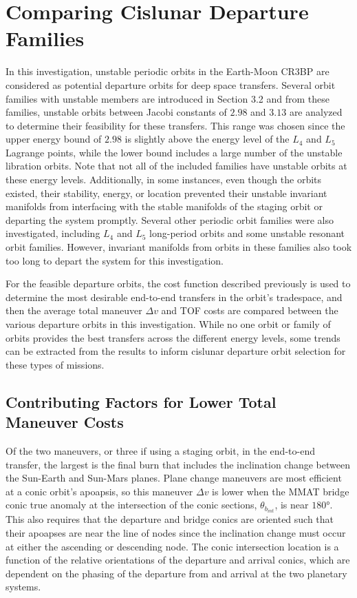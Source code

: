 \section{Comparing Cislunar Departure Families}
In this investigation, unstable periodic orbits in the Earth-Moon CR3BP are considered as potential
departure orbits for deep space transfers. Several orbit families with unstable members are
introduced in Section 3.2 and from these families, unstable orbits between Jacobi constants of
$2.98$ and $3.13$ are analyzed to determine their feasibility for these transfers. This range was
chosen since the upper energy bound of $2.98$ is slightly above the energy level of the $L_{4}$ and
$L_{5}$ Lagrange points, while the lower bound includes a large number of the unstable libration
orbits\cite{Zimovan:2017}. Note that not all of the included families have unstable orbits at these
energy levels. Additionally, in some instances, even though the orbits existed, their stability,
energy, or location prevented their unstable invariant manifolds from interfacing with the stable
manifolds of the staging orbit or departing the system promptly. Several other periodic orbit
families were also investigated, including $L_{4}$ and $L_{5}$ long-period orbits and some unstable
resonant orbit families. However, invariant manifolds from orbits in these families also took too
long to depart the system for this investigation.

For the feasible departure orbits, the cost function described previously is used to determine the
most desirable end-to-end transfers in the orbit's tradespace, and then the average total
maneuver $\Delta v$ and TOF costs are compared between the various departure orbits in this
investigation. While no one orbit or family of orbits provides the best transfers across the
different energy levels, some trends can be extracted from the results to inform cislunar departure
orbit selection for these types of missions.

\subsection{Contributing Factors for Lower Total Maneuver Costs}
Of the two maneuvers, or three if using a staging orbit, in the end-to-end transfer, the largest is
the final burn that includes the inclination change between the Sun-Earth and Sun-Mars planes.
Plane change maneuvers are most efficient at a conic orbit's apoapsis, so this maneuver $\Delta v$
is lower when the MMAT bridge conic true anomaly at the intersection of the conic sections,
$\theta_{b_{int}}$, is near $\ang{180}$. This also requires that the departure and bridge conics
are oriented such that their apoapses are near the line of nodes since the inclination change must
occur at either the ascending or descending node. The conic intersection location is a function of
the relative orientations of the departure and arrival conics, which are dependent on the phasing
of the departure from and arrival at the two planetary systems. 

